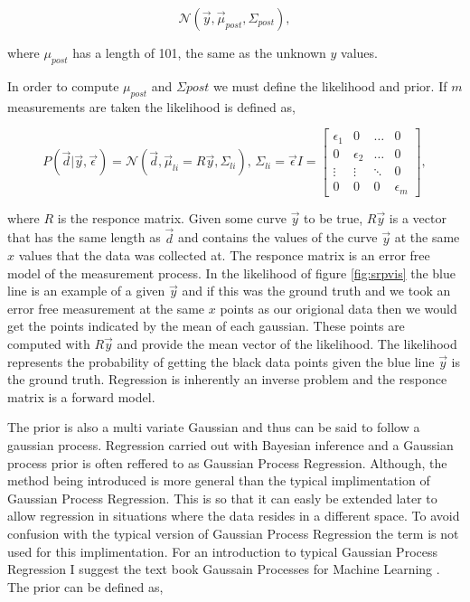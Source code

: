 \begin{equation}
  \mathcal{N}(\vec y, \vec{\mu}_{post}, \Sigma_{post}),
\end{equation}

\noindent where $\mu_{post}$ has a length of 101, the same as the unknown $y$ values.

In order to compute $\mu_{post}$ and $\Sigma{post}$ we must define the likelihood and prior. If $m$ measurements are taken the likelihood is defined as, 

\begin{equation}
  P(\vec{d}|\vec{y},\vec \epsilon) = \mathcal{N}(\vec{d}, \vec \mu_{li} = R\vec{y}, \Sigma_{li}),\, \Sigma_{li} = \vec{\epsilon}I = 
    \begin{bmatrix}
        \epsilon_1 & 0 & \hdots & 0\\
        0 & \epsilon_2 & \hdots & 0\\
        \vdots & \vdots & \ddots & 0 \\
        0 & 0 & 0 &\epsilon_m
    \end{bmatrix},
  \label{eq:likelihood}
\end{equation}

\noindent where $R$ is the responce matrix. Given some curve $\vec y$ to be true, $R \vec y$ is a vector that has the same length as $\vec d$ and contains the values of the curve $\vec y$ at the same $x$ values that the data was collected at. The responce matrix is an error free model of the measurement process. In the likelihood of figure \ref{fig:srpvis} the blue line is an example of a given $\vec{y}$ and if this was the ground truth and we took an error free measurement at the same $x$ points as our origional data then we would get the points indicated by the mean of each gaussian. These points are computed with $R\vec y$ and provide the mean vector of the likelihood. The likelihood represents the probability of getting the black data points given the blue line $\vec y$ is the ground truth. Regression is inherently an inverse problem and the responce matrix is a forward model. 

The prior is also a multi variate Gaussian and thus can be said to follow a gaussian process. Regression carried out with Bayesian inference and a Gaussian process prior is often reffered to as Gaussian Process Regression. Although, the method being introduced is more general than the typical implimentation of Gaussian Process Regression. This is so that it can easly be extended later to allow regression in situations where the data resides in a different space. To avoid confusion with the typical version of Gaussian Process Regression the term is not used for this implimentation. For an introduction to typical Gaussian Process Regression I suggest the text book Gaussain Processes for Machine Learning \cite{gp4ml}. The prior can be defined as,

